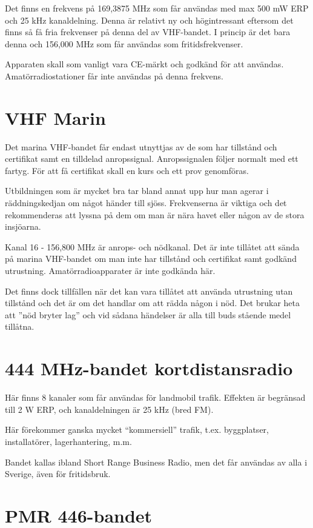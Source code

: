 \documentclass[12ypt,swedish,a4paper]{report}
\begin{document}
Det finns en frekvens på 169,3875 MHz som får användas med max 500 mW ERP och 25 kHz kanaldelning. Denna är relativt ny och högintressant eftersom det finns så få fria frekvenser på denna del av VHF-bandet. I princip är det bara denna och 156,000 MHz som får användas som fritidsfrekvenser.

Apparaten skall som vanligt vara CE-märkt och godkänd för att användas. Amatörradiostationer får inte användas på denna frekvens.

\section{VHF Marin}

Det marina VHF-bandet får endast utnyttjas av de som har tillstånd och certifikat samt en tilldelad anropssignal. Anropssignalen följer normalt med ett fartyg. För att få certifikat skall en kurs och ett prov genomföras.

Utbildningen som är mycket bra tar bland annat upp hur man agerar i räddningskedjan om något händer till sjöss. Frekvenserna är viktiga och det rekommenderas att lyssna på dem om man är nära havet eller någon av de stora insjöarna.

Kanal 16 - 156,800 MHz är anrops- och nödkanal. Det är inte tillåtet att sända på marina VHF-bandet om man inte har tillstånd och certifikat samt godkänd utrustning. Amatörradioapparater är inte godkända här.

Det finns dock tillfällen när det kan vara tillåtet att använda utrustning utan tillstånd och det är om det handlar om att rädda någon i nöd. Det brukar heta att ''nöd bryter lag'' och vid sådana händelser är alla till buds stående medel tillåtna.

\section{444 MHz-bandet kortdistansradio}

Här finns 8 kanaler som får användas för landmobil trafik. Effekten är begränsad till 2 W ERP, och kanaldelningen är 25 kHz (bred FM).

Här förekommer ganska mycket ``kommersiell'' trafik, t.ex. byggplatser, installatörer, lagerhantering, m.m.

Bandet kallas ibland Short Range Business Radio, men det får användas av alla i Sverige, även för fritidsbruk.

\section{PMR 446-bandet}
\end{document}
